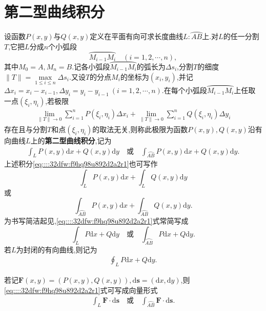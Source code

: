 \documentclass[../../main.tex]{subfiles}%
\begin{document}
\section{第二型曲线积分}

\begin{definition}\label{definecolor:平面上的第二型曲线积分}
设函数$P(x,y)$与$Q(x,y)$定义在平面有向可求长度曲线$L:\wideparen{AB}$上.对$L$的任一分割$T$,它把$L$分成$n$个小弧段
\[
\wideparen{M_{i-1}M_i}\quad(i=1,2,\cdots,n),
\]
其中$M_0=A,M_n=B$.记各小弧段$\wideparen{M_{i-1}M_i}$的弧长为$\Delta s_i$,分割$T$的细度$\|T\|=\max\limits_{1 \leqslant i \leqslant n}\Delta s_i$.又设$T$的分点$M_i$的坐标为$(x_i,y_i)$,并记$\Delta x_i=x_i-x_{i-1},\Delta y_i=y_i-y_{i-1}\ (i=1,2,\cdots,n)$.在每个小弧段$\wideparen{M_{i-1}M_i}$上任取一点$(\xi_i,\eta_i)$,若极限
\begin{align*}
\lim\limits_{\|T\| \to 0} \sum_{i=1}^n P(\xi_i,\eta_i)\Delta x_i + \lim\limits_{\|T\| \to 0} \sum_{i=1}^n Q(\xi_i,\eta_i)\Delta y_i
\end{align*}
存在且与分割$T$和点$(\xi_i,\eta_i)$的取法无关,则称此极限为函数$P(x,y),Q(x,y)$沿有向曲线$L$上的\textbf{第二型曲线积分},记为
\begin{align}
\int_L P(x,y)\mathrm{d}x + Q(x,y)\mathrm{d}y\quad\text{或}\quad\int_{\wideparen{AB}} P(x,y)\mathrm{d}x + Q(x,y)\mathrm{d}y. \label{eq::::32dfw:f9hq98u892d2a2r1}
\end{align}
上述积分\eqref{eq::::32dfw:f9hq98u892d2a2r1}也可写作
\[
\int_L P(x,y)\mathrm{d}x + \int_L Q(x,y)\mathrm{d}y
\]
或
\[
\int_{\wideparen{AB}} P(x,y)\mathrm{d}x + \int_{\wideparen{AB}} Q(x,y)\mathrm{d}y.
\]
为书写简洁起见,\eqref{eq::::32dfw:f9hq98u892d2a2r1}式常简写成
\[
\int_L P\mathrm{d}x + Q\mathrm{d}y\quad\text{或}\quad\int_{\wideparen{AB}} P\mathrm{d}x + Q\mathrm{d}y.
\]
若$L$为封闭的有向曲线,则记为
\begin{align*}
\oint_L P\mathrm{d}x + Q\mathrm{d}y. 
\end{align*}

若记$\boldsymbol{F}(x,y)=(P(x,y),Q(x,y)),\mathrm{d}\boldsymbol{s}=(\mathrm{d}x,\mathrm{d}y)$,则\eqref{eq::::32dfw:f9hq98u892d2a2r1}式可写成向量形式
\begin{align*}
\int_L \boldsymbol{F} \cdot \mathrm{d}\boldsymbol{s}\quad\text{或}\quad\int_{\wideparen{AB}} \boldsymbol{F} \cdot \mathrm{d}\boldsymbol{s}. 
\end{align*}
\end{definition}
\end{document}
